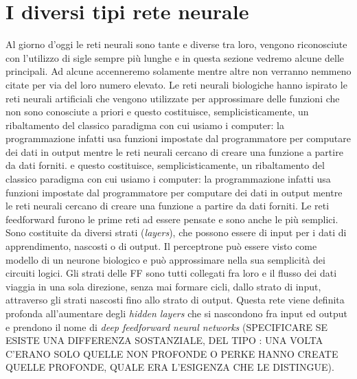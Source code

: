 \section*{I diversi tipi rete neurale}
Al giorno d'oggi le reti neurali sono tante e diverse tra loro, vengono riconosciute con l'utilizzo di sigle sempre più lunghe e in questa sezione vedremo alcune delle principali. Ad alcune accenneremo solamente mentre altre non verranno nemmeno citate per via del loro numero elevato.
Le reti neurali biologiche hanno ispirato le reti neurali artificiali che vengono utilizzate per approssimare delle funzioni che non sono conosciute a priori \cite{wiki:tipi} e questo costituisce, semplicisticamente, un ribaltamento del classico paradigma con cui usiamo i computer: la programmazione infatti usa funzioni impostate dal programmatore per computare dei dati in output mentre le reti neurali cercano di creare una funzione a partire da dati forniti.
e questo costituisce, semplicisticamente, un ribaltamento del classico paradigma con cui usiamo i computer: la programmazione infatti usa funzioni impostate dal programmatore per computare dei dati in output mentre le reti neurali cercano di creare una funzione a partire da dati forniti.
Le reti feedforward furono le prime reti ad essere pensate e sono anche le più semplici. Sono costituite da diversi strati (\textit{layers}), che possono essere di input per i dati di apprendimento, nascosti o di output.
Il perceptrone può essere visto come modello di un neurone biologico e può approssimare nella sua semplicità dei circuiti logici. Gli strati delle FF sono tutti collegati fra loro e il flusso dei dati viaggia in una sola direzione, senza mai formare cicli, dallo strato di input, attraverso gli strati nascosti fino allo strato di output. Questa rete viene definita profonda all'aumentare degli \textit{hidden layers} che si nascondono fra input ed output e prendono il nome di \textit{deep feedforward neural networks} (SPECIFICARE SE ESISTE UNA DIFFERENZA SOSTANZIALE, DEL TIPO : UNA VOLTA C'ERANO SOLO QUELLE NON PROFONDE O PERKE HANNO CREATE QUELLE PROFONDE, QUALE ERA L'ESIGENZA CHE LE DISTINGUE).


